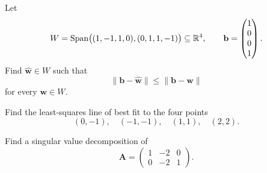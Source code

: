 \begin{problem}
Let
\[
W=\operatorname{Span}\bigl((1,-1,1,0),(0,1,1,-1)\bigr)\subseteq\mathbb{R}^4,
\qquad
\mathbf b=
\begin{pmatrix}1\\0\\0\\1\end{pmatrix}.
\]
Find $\widehat{\mathbf w}\in W$ such that
\[
\|\mathbf b-\widehat{\mathbf w}\|\le\|\mathbf b-\mathbf w\|
\]
for every $\mathbf w\in W$.
\end{problem}

\begin{problem}
Find the least-squares line of best fit to the four points
\[
(0,-1),\quad(-1,-1),\quad(1,1),\quad(2,2).
\]
\end{problem}

\begin{problem}
Find a singular value decomposition of
\[
\mathbf A=
\begin{pmatrix}
1&-2&0\\
0&-2&1
\end{pmatrix}.
\]
\end{problem}

